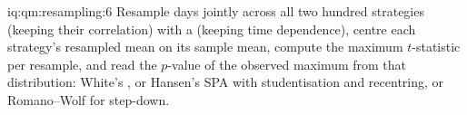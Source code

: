 \begin{solution}{iq:qm:resampling:6}
Resample days jointly across all two hundred strategies (keeping their correlation) with a  (keeping time dependence),
centre each strategy's resampled mean on its sample mean, compute the maximum $t$-statistic per resample, and read the $p$-value of the
observed maximum from that distribution: White's , or Hansen's SPA with studentisation and recentring, or Romano--Wolf for
step-down.
\end{solution}
